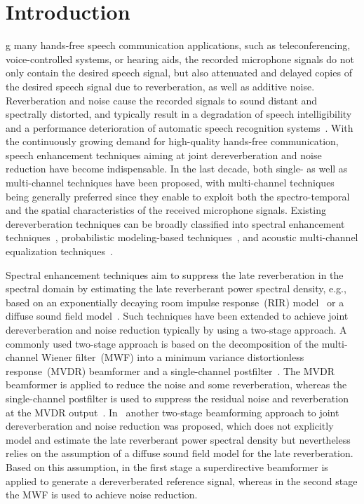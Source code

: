 \documentclass[10pt]{IEEEtran}
\begin{document}
\section{Introduction}
g many hands-free speech communication applications, such as teleconferencing, voice-controlled systems, or hearing aids, the recorded microphone signals do not only contain the desired speech signal, but also attenuated and delayed copies of the desired speech signal due to reverberation, as well as additive noise.
Reverberation and noise cause the recorded signals to sound distant and spectrally distorted, and typically result in a degradation of speech intelligibility and a performance deterioration of automatic speech recognition systems~\cite{Omologo_1998,Beutelmann_2006}.
With the continuously growing demand for high-quality hands-free communication, speech enhancement techniques aiming at joint dereverberation and noise reduction have become indispensable.
In the last decade, both single- as well as multi-channel techniques have been proposed, with multi-channel techniques being generally preferred since they enable to exploit both the spectro-temporal and the spatial characteristics of the received microphone signals.
Existing dereverberation techniques can be broadly classified into spectral enhancement techniques~\cite{Lebart_ACUSTICA_2001,Habets_ICASSP_2005,Habets2009a,Kuklasinski_EUSIPCO_2014}, probabilistic modeling-based techniques~\cite{Nakatani_ITASLP_2010,Jukic_ICASSP_2014,Schwartz_ITASLP_2015}, and acoustic multi-channel equalization techniques~\cite{Miyoshi_ITASS_1988, Kallinger_ICASSP_2006,Jungmann_ITASLP_2012, Kodrasi_ITASLP_2013, Lim_ITASLP_2014, Rashobh_ITASLP_2014}.

Spectral enhancement techniques aim to suppress the late reverberation in the spectral domain by estimating the late reverberant power spectral density, e.g., based on an exponentially decaying room impulse response~(RIR) model~\cite{Lebart_ACUSTICA_2001,Habets_ICASSP_2005,Habets2009a} or a diffuse sound field model~\cite{Kuklasinski_EUSIPCO_2014}.
Such techniques have been extended to achieve joint dereverberation and noise reduction typically by using a two-stage approach.
A commonly used two-stage approach is based on the decomposition of the multi-channel Wiener filter~(MWF) into a minimum variance distortionless response~(MVDR) beamformer and a single-channel postfilter~\cite{Simmer_book_2001}. 
The MVDR beamformer is applied to reduce the noise and some reverberation, whereas the single-channel postfilter is used to suppress the residual noise and reverberation at the MVDR output~\cite{Braun_EUSIPCO_2013,Cauchi_Reverb_2014}. 
In~\cite{Habets_ITASLP_2013} another two-stage beamforming approach to joint dereverberation and noise reduction was proposed, which does not explicitly model and estimate the late reverberant power spectral density but nevertheless relies on the assumption of a diffuse sound field model for the late reverberation. 
Based on this assumption, in the first stage a superdirective beamformer is applied to generate a dereverberated reference signal, whereas in the second stage the MWF is used to achieve noise reduction.
\end{document}
